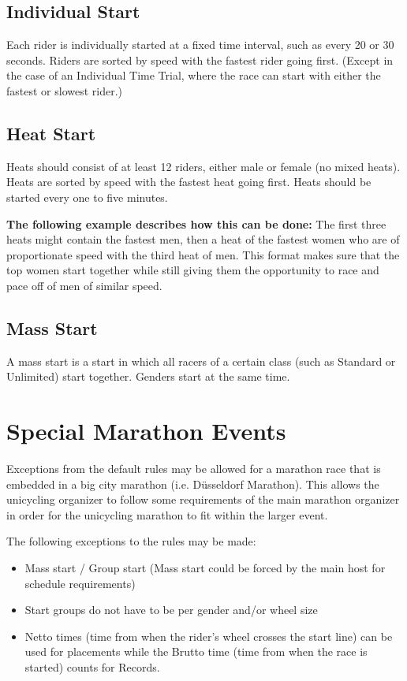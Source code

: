 \subsection{Individual Start \label{subsec:road_heat-assignment_individual-start}}
Each rider is individually started at a fixed time interval, such as every 20 or 30 seconds.
Riders are sorted by speed with the fastest rider going first.
(Except in the case of an Individual Time Trial, where the race can start with either the fastest or slowest rider.)

\subsection{Heat Start \label{subsec:road_heat-assignment_heat-start}}
Heats should consist of at least 12 riders, either male or female (no mixed heats).
Heats are sorted by speed with the fastest heat going first.
Heats should be started every one to five minutes.

\textbf{The following example describes how this can be done:}
The first three heats might contain the fastest men, then a heat of the fastest women who are of proportionate speed with the third heat of men.
This format makes sure that the top women start together while still giving them the opportunity to race and pace off of men of similar speed.

\subsection{Mass Start \label{subsec:road_heat-assignment_mass-start}}
A mass start is a start in which all racers of a certain class (such as Standard or Unlimited) start together.
Genders start at the same time.

\section{Special Marathon Events}
Exceptions from the default rules may be allowed for a marathon race that is embedded in a big city marathon (i.e. Düsseldorf Marathon).
This allows the unicycling organizer to follow some requirements of the main marathon organizer in order for the unicycling marathon to fit within the larger event.

The following exceptions to the rules may be made:
\begin{itemize}
\item Mass start / Group start (Mass start could be forced by the main host for schedule requirements) 
\item Start groups do not have to be per gender and/or wheel size
\item Netto times (time from when the rider's wheel crosses the start line) can be used for placements while the Brutto time (time from when the race is started) counts for Records.
\end{itemize}

